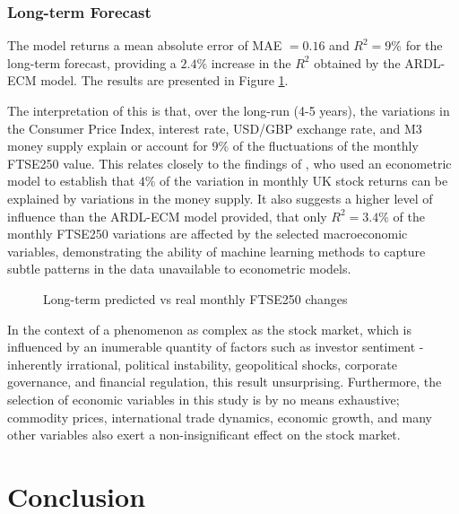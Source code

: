 \documentclass[11pt,a4paper]{article}
\newcommand{\citeboth}[1]{\citeauthor{#1} \citep{#1}}
\begin{document}
\subsubsection{Long-term Forecast}
The model returns a mean absolute error of MAE $=0.16$ and 
$R^2 = 9\%$ for the long-term forecast, providing a 
$2.4\%$ increase in the $R^2$ obtained by the ARDL-ECM model. The results are presented 
in Figure \ref{fig:longmonthly}.

The interpretation of this is that, over the long-run (4-5 years), the variations in the 
Consumer Price Index, interest rate, USD/GBP exchange rate, and M3 money 
supply explain or account for $9\%$ of the fluctuations of the
monthly FTSE250 value. This relates closely to the findings of \citeboth{conover1999}, 
who used an econometric model to establish that $4\%$ of the variation in monthly UK stock returns can be 
explained by variations in the money supply. It also suggests a higher level of influence 
than the ARDL-ECM model provided, that only $R^2=3.4\%$ of the monthly FTSE250 variations 
are affected by the selected macroeconomic variables, demonstrating the ability of machine learning
methods to capture subtle patterns in the data unavailable to econometric models. 

\begin{figure}[H]
    \centering
    \hspace*{-1.5cm}
      
    \caption{Long-term predicted vs real monthly FTSE250 changes}
    \label{fig:longmonthly}
\end{figure}



In the context of a phenomenon as complex as the stock market,
which is influenced by an inumerable quantity of factors such as investor sentiment
- inherently irrational, 
political instability, geopolitical shocks, corporate governance, and financial regulation, this result 
unsurprising. Furthermore, the selection of economic variables in this study
is by no means exhaustive; commodity prices, international trade dynamics,
economic growth, and many other variables also exert a non-insignificant 
effect on the stock market.


\section{Conclusion}
\label{sec: conc}
\end{document}
